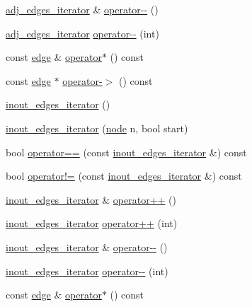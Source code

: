 \begin{DoxyCompactItemize}
\item 
\mbox{\hyperlink{classnode_abdd49248203010f2d5432dfef22d017a}{adj\+\_\+edges\+\_\+iterator}} \& \mbox{\hyperlink{classnode_a99fdb299b044facd9cb3f90f18a559fd}{operator-\/-\/}} ()
\item 
\mbox{\hyperlink{classnode_abdd49248203010f2d5432dfef22d017a}{adj\+\_\+edges\+\_\+iterator}} \mbox{\hyperlink{classnode_a1e5751de7ba220836ffee941707c277b}{operator-\/-\/}} (int)
\item 
const \mbox{\hyperlink{classedge}{edge}} \& \mbox{\hyperlink{classnode_a914c034c6f43029ad9b7f0826dd2614f}{operator$\ast$}} () const
\item 
const \mbox{\hyperlink{classedge}{edge}} $\ast$ \mbox{\hyperlink{classnode_a71b168f27cc7338906814f6a3ecc176f}{operator-\/$>$}} () const
\item 
\mbox{\hyperlink{classnode_a854d596611e6a3342090cce71cedf300}{inout\+\_\+edges\+\_\+iterator}} ()
\item 
\mbox{\hyperlink{classnode_a2990a550ae39da89f6d18e6b5faf519e}{inout\+\_\+edges\+\_\+iterator}} (\mbox{\hyperlink{classnode}{node}} n, bool start)
\item 
bool \mbox{\hyperlink{classnode_ae6b790b8b1dd9733be73b1d2c84716df}{operator==}} (const \mbox{\hyperlink{classnode_a854d596611e6a3342090cce71cedf300}{inout\+\_\+edges\+\_\+iterator}} \&) const
\item 
bool \mbox{\hyperlink{classnode_ac4efb2e8423b3502f9d3a1bd6de80e73}{operator!=}} (const \mbox{\hyperlink{classnode_a854d596611e6a3342090cce71cedf300}{inout\+\_\+edges\+\_\+iterator}} \&) const
\item 
\mbox{\hyperlink{classnode_a854d596611e6a3342090cce71cedf300}{inout\+\_\+edges\+\_\+iterator}} \& \mbox{\hyperlink{classnode_a934fd5ac6865ae23f3b2758a573550ec}{operator++}} ()
\item 
\mbox{\hyperlink{classnode_a854d596611e6a3342090cce71cedf300}{inout\+\_\+edges\+\_\+iterator}} \mbox{\hyperlink{classnode_a754f5fcf2ab3d5bf26e1e4fdc47cc766}{operator++}} (int)
\item 
\mbox{\hyperlink{classnode_a854d596611e6a3342090cce71cedf300}{inout\+\_\+edges\+\_\+iterator}} \& \mbox{\hyperlink{classnode_a046088eba56244e29945d0197f6b642f}{operator-\/-\/}} ()
\item 
\mbox{\hyperlink{classnode_a854d596611e6a3342090cce71cedf300}{inout\+\_\+edges\+\_\+iterator}} \mbox{\hyperlink{classnode_a9b906907ed01bb04c06bed300428da11}{operator-\/-\/}} (int)
\item 
const \mbox{\hyperlink{classedge}{edge}} \& \mbox{\hyperlink{classnode_a914c034c6f43029ad9b7f0826dd2614f}{operator$\ast$}} () const

\end{DoxyCompactItemize}
